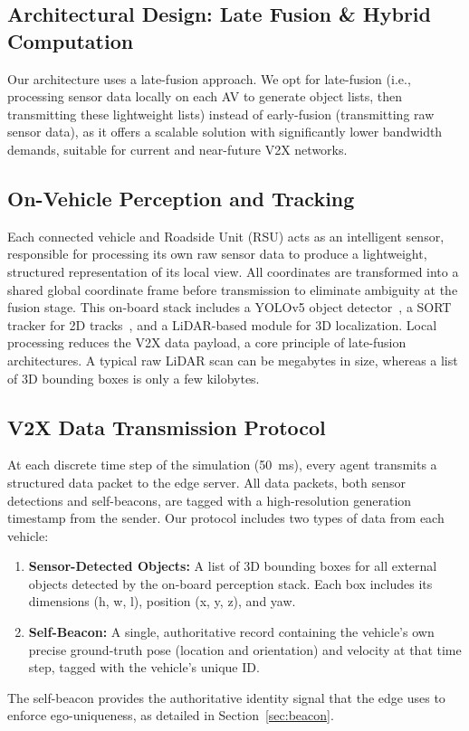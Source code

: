 \subsection{Architectural Design: Late Fusion \& Hybrid Computation}
Our architecture uses a late-fusion approach. We opt for late-fusion (i.e., processing sensor data locally on each AV to generate object lists, then transmitting these lightweight lists) instead of early-fusion (transmitting raw sensor data), as it offers a scalable solution with significantly lower bandwidth demands, suitable for current and near-future V2X networks.


\subsection{On-Vehicle Perception and Tracking}

Each connected vehicle and Roadside Unit (RSU) acts as an intelligent sensor, responsible for processing its own raw sensor data to produce a lightweight, structured representation of its local view. All coordinates are transformed into a shared global coordinate frame before transmission to eliminate ambiguity at the fusion stage. This on-board stack includes a YOLOv5 object detector~\cite{glenn_jocher_2022_7347926}, a SORT tracker for 2D tracks~\cite{Bewley2016_sort}, and a LiDAR-based module for 3D localization. Local processing reduces the V2X data payload, a core principle of late-fusion architectures. A typical raw LiDAR scan can be megabytes in size, whereas a list of 3D bounding boxes is only a few kilobytes.

\subsection{V2X Data Transmission Protocol}

At each discrete time step of the simulation (50~ms), every agent transmits a structured data packet to the edge server. All data packets, both sensor detections and self-beacons, are tagged with a high-resolution generation timestamp from the sender. Our protocol includes two types of data from each vehicle:
\begin{enumerate}[label=\arabic*.,noitemsep,topsep=0pt,leftmargin=1.2\parindent]
    \item \textbf{Sensor-Detected Objects:} A list of 3D bounding boxes for all external objects detected by the on-board perception stack. Each box includes its dimensions (h, w, l), position (x, y, z), and yaw. 
    \item \textbf{Self-Beacon:} A single, authoritative record containing the vehicle's own precise ground-truth pose (location and orientation) and velocity at that time step, tagged with the vehicle's unique ID.
\end{enumerate}
The self-beacon provides the authoritative identity signal that the edge uses to enforce ego-uniqueness, as detailed in Section~\ref{sec:beacon}.

